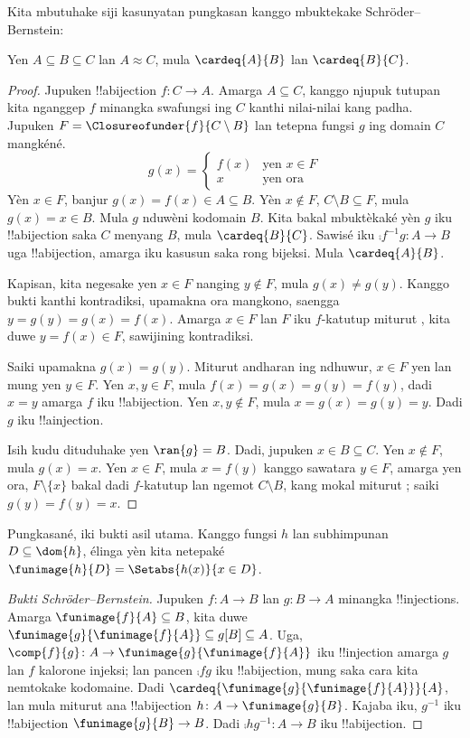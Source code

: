\documentclass[../../../include/open-logic-section]{subfiles}
\begin{document}
Kita mbutuhake siji kasunyatan pungkasan kanggo mbuktekake
Schr\"oder--Bernstein:

\begin{prop}
Yen $A \subseteq B \subseteq C$ lan $A \approx C$, mula $\cardeq{A}{B}$ lan $\cardeq{B}{C}$.
\end{prop}

\begin{proof}
Jupuken !!a{bijection} $f \colon C \to A$. Amarga $A\subseteq C$,
kanggo njupuk tutupan kita nganggep $f$ minangka swafungsi ing $C$
kanthi nilai-nilai kang padha. Jupuken $F =
\Closureofunder{f}{C \setminus B}$ lan tetepna fungsi $g$ ing
domain $C$ mangkéné.
\[
	g(x) =
	\begin{cases}
			f(x) &\text{yen $x \in F$}\\
			x & \text{yen ora}
	\end{cases}
\]
Yèn $x\in F$, banjur $g(x)=f(x)\in A\subseteq B$. Yèn $x\notin F$,
$C\setminus B\subseteq F$, mula $g(x)=x\in B$. Mula $g$ nduwèni kodomain $B$.
Kita bakal mbuktèkaké yèn $g$ iku !!a{bijection} saka $C$ menyang $B$,
mula $\cardeq{B}{C}$. Sawisé iku $\comp{f^{-1}}{g} \colon A \to B$ uga
!!a{bijection}, amarga iku kasusun saka rong bijeksi. Mula $\cardeq{A}{B}$.

Kapisan, kita negesake yen $x \in F$ nanging $y\notin F$, mula $g(x) \neq
g(y)$. Kanggo bukti kanthi kontradiksi, upamakna ora mangkono, saengga
$y = g(y) = g(x) = f(x)$. Amarga $x \in F$ lan $F$ iku $f$-katutup
miturut , kita duwe $y = f(x) \in F$, sawijining
kontradiksi.

Saiki upamakna $g(x) = g(y)$. Miturut andharan ing ndhuwur, $x \in F$
yen lan mung yen $y \in F$. Yen $x, y \in F$, mula $f(x) = g (x) =
g(y) = f(y)$, dadi $x = y$ amarga $f$ iku !!a{bijection}. Yen $x, y
\notin F$, mula $x = g(x) = g(y) = y$. Dadi $g$ iku !!a{injection}.

Isih kudu dituduhake yen $\ran{g} = B$. Dadi, jupuken $x \in B
\subseteq C$. Yen $x \notin F$, mula $g(x) = x$. Yen $x \in F$,
mula $x = f(y)$ kanggo sawatara $y \in F$, amarga yen ora,
$F \setminus \{x\}$ bakal dadi $f$-katutup lan ngemot $C\setminus B$,
kang mokal miturut ; saiki $g(y) = f(y) = x$.
\end{proof}

Pungkasané, iki bukti asil utama. Kanggo fungsi $h$ lan subhimpunan $D\subseteq\dom{h}$, élinga yèn kita netepaké $\funimage{h}{D} = \Setabs{h(x)}{x
\in D}$.

\begin{proof}[Bukti Schr\"oder--Bernstein] Jupuken $f \colon A \to B$
lan $g \colon B \to A$ minangka !!{injection}s. Amarga
$\funimage{f}{A} \subseteq B$, kita duwe
$\funimage{g}{\funimage{f}{A}} \subseteq g[B] \subseteq A$. Uga,
$\comp{f}{g} \colon A \to \funimage{g}{\funimage{f}{A}}$ iku
!!{injection} amarga $g$ lan $f$ kalorone injeksi; lan pancen
$\comp{f}{g}$ iku !!a{bijection}, mung saka cara kita nemtokake
kodomaine. Dadi $\cardeq{\funimage{g}{\funimage{f}{A}}}{A}$, lan mula
miturut  ana !!a{bijection} $h \colon A \to
\funimage{g}{B}$. Kajaba iku, $g^{-1}$ iku !!a{bijection}
$\funimage{g}{B} \to B$. Dadi $\comp{h}{g^{-1}} \colon A \to B$ iku
!!a{bijection}.
\end{proof}
\end{document}
